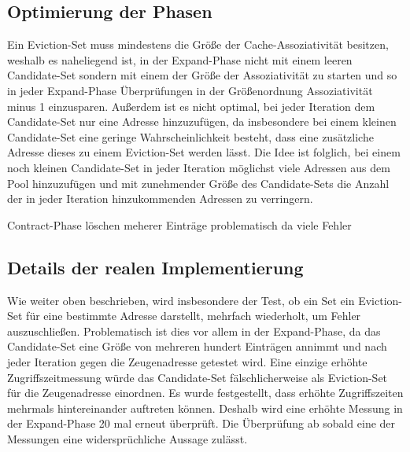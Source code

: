 \subsection{Optimierung der Phasen}

Ein Eviction-Set muss mindestens die Größe der Cache-Assoziativität besitzen, weshalb es naheliegend ist, in der Expand-Phase nicht mit einem leeren Candidate-Set sondern mit einem der Größe der Assoziativität zu starten und so in jeder Expand-Phase Überprüfungen in der Größenordnung Assoziativität minus 1 einzusparen.
Außerdem ist es nicht optimal, bei jeder Iteration dem Candidate-Set nur eine Adresse hinzuzufügen, da insbesondere bei einem kleinen Candidate-Set eine geringe Wahrscheinlichkeit besteht, dass eine zusätzliche Adresse dieses zu einem Eviction-Set werden lässt.
Die Idee ist folglich, bei einem noch kleinen Candidate-Set in jeder Iteration möglichst viele Adressen aus dem Pool hinzuzufügen und mit zunehmender Größe des Candidate-Sets die Anzahl der in jeder Iteration hinzukommenden Adressen zu verringern.

Contract-Phase löschen meherer Einträge problematisch da viele Fehler



\subsection{Details der realen Implementierung}

Wie weiter oben beschrieben, wird insbesondere der Test, ob ein Set ein Eviction-Set für eine bestimmte Adresse darstellt, mehrfach wiederholt, um Fehler auszuschließen. 
Problematisch ist dies vor allem in der Expand-Phase, da das Candidate-Set eine Größe von mehreren hundert Einträgen annimmt und nach jeder Iteration gegen die Zeugenadresse getestet wird. 
Eine einzige erhöhte Zugriffszeitmessung würde das Candidate-Set fälschlicherweise als Eviction-Set für die Zeugenadresse einordnen. 
Es wurde festgestellt, dass erhöhte Zugriffszeiten mehrmals hintereinander auftreten können. Deshalb wird eine erhöhte Messung in der Expand-Phase 20 mal erneut überprüft. 
Die Überprüfung ab sobald eine der Messungen eine widersprüchliche Aussage zulässt.

